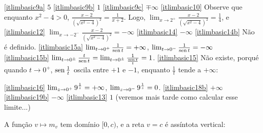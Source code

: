 \begin{Solution}{4.21}
\eqref{itlimbasic9a} $5$
\eqref{itlimbasic9b} $1$
\eqref{itlimbasic9c} $\mp \infty$
\eqref{itlimbasic10} Observe que enquanto $x^2-4>0$, $\frac{x-2}{(
\sqrt{x^2-4})^2}=\frac{1}{x+2}$. Logo, $\lim_{x\to
2^+}\frac{x-2}{(\sqrt{x^2-4})^2}=\frac14$, e
\eqref{itlimbasic12} $\lim_{x\to -2^-}\frac{x-2}{(\sqrt{x^2-4})^2}=
-\infty$
\eqref{itlimbasic14} $-\infty$
\eqref{itlimbasic14b} Não é definido.
\eqref{itlimbasic15a}   $\lim_{t\to 0^+}\frac{1}{\operatorname{sen} t}=+\infty$,
$\lim_{t\to 0^-}\frac{1}{\operatorname{sen} t}=-\infty$
\eqref{itlimbasic15b}   $\lim_{t\to 0^\pm}\frac{t}{\operatorname{sen} t}=\lim_{t\to
0^\pm}\frac{1}{\frac{\operatorname{sen} t}{t}}=1$.
\eqref{itlimbasic15} Não existe, porqué quando $t\to 0^+$, $\operatorname{sen}
\frac1t$
oscila entre $+1$ e $-1$, enquanto $\frac1t$ tende a $+\infty$:
\begin{center}
\begin{bmlimage}\end{bmlimage}
\end{center}
\eqref{itlimbasic16} $\lim_{{z}\to {0^+}}9^{\frac{1}{z}}=+\infty$,
$\lim_{{z}\to {0^-}}9^{\frac{1}{z}}=0$.
\eqref{itlimbasic18b} $+\infty$
\eqref{itlimbasic19b} $-\infty$
\eqref{itlimbasic13} $1$ (veremos mais tarde como calcular esse
limite...)
\end{Solution}
\begin{Solution}{4.22}
A função $v\mapsto m_v$ tem domínio $[0,c)$, e a reta $v=c$ é
assíntota vertical:
\begin{center}
\begin{bmlimage}\end{bmlimage}
\end{center}
\end{Solution}
